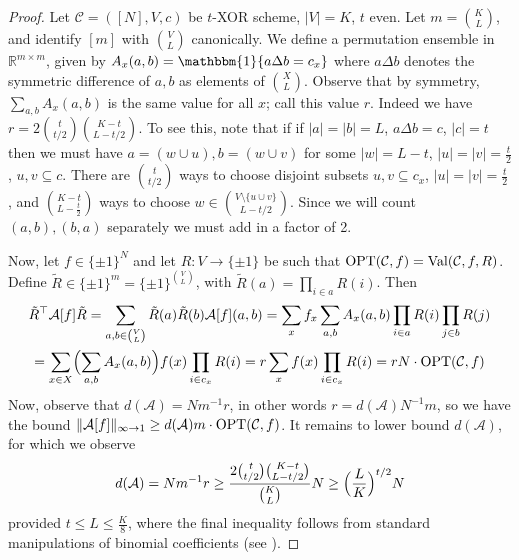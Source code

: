 \begin{proof}
Let $\mathcal{C} = ([N],V,c)$ be $t$-XOR scheme, $|V|=K$, $t$ even.
Let $m = \binom{K}{L}$, and identify $[m]$ with $\binom{V}{L}$ canonically. We define a permutation ensemble in $\mathbb{R}^{m \times m}$, given by $A_x(a,b) = \mathbbm{1}\{a\Delta b = c_x\}$
where $a\Delta b$ denotes the symmetric difference of $a,b$ as elements of $\binom{X}{L}$. Observe that by symmetry, $\sum_{a,b}A_x(a,b)$ is the same value for all $x$; call this value $r$. Indeed we have $r = 2\binom{t}{t/2}\binom{K - t}{L - t/2}$. To see this, note that if if $|a|=|b|=L$, $a \Delta b = c$, $|c|=t$ then we must have $a = (w \cup u), b = (w \cup v)$ for some $|w|=L-t$, $|u|=|v|=\frac{t}{2}$, $u,v \subseteq c$. There are $\binom{t}{t/2}$ ways to choose disjoint subsets $u,v \subseteq c_x$, $|u|=|v|= \frac{t}{2}$, and $\binom{K-t}{L-\frac{t}{2}}$ ways to choose $w \in \binom{V\setminus \{u \cup v\}}{L-t/2}$. Since we will count $(a,b), (b,a)$ separately we must add in a factor of 2. 

Now, let $f \in \{\pm 1\}^N$ and let $R: V \to \{\pm 1\}$ be such that $\mathrm{OPT}(\mathcal{C},f) = \mathrm{Val}(\mathcal{C},f,R)$.
Define $\tilde{R} \in \{\pm 1\}^m = \{\pm 1\}^{\binom{V}{L}}$, with $\tilde{R}(a) = \prod_{i \in a} R(i)$. Then
\begin{gather*}
	\tilde{R}^\top \mathcal{A}[f] \tilde{R} = \sum_{a,b \in \binom{V}{L}} \tilde{R}(a)\tilde{R}(b) \mathcal{A}[f](a,b)
	= \sum_{x} f_x\sum_{a,b}A_x(a,b)\prod_{i \in a} R(i) \prod_{j \in b} R(j)\\
	= \sum_{x \in X}\Bigl(\sum_{a,b}A_x(a,b)\Bigr)f(x)\prod_{i \in c_x} R(i)
	= r\sum_{x} f(x)\prod_{i \in c_x} R(i)
	= rN \cdot \mathrm{OPT}(\mathcal{C},f) 
\end{gather*}
Now, observe that $d(\mathcal{A}) =  Nm^{-1}r$, in other words $r = d(\mathcal{A}) N^{-1}m$, so we have the bound $ \Vert \mathcal{A}[f] \Vert_{\infty \to 1} \geq d(\mathcal{A})m \cdot \mathrm{OPT}(\mathcal{C},f)$. It remains to lower bound $d(\mathcal{A})$, for which we observe
\begin{gather*}
d(\mathcal{A}) = Nm^{-1}r \geq \frac{2\binom{t}{t/2}\binom{K - t}{L - t/2}}{ \binom{K}{L}}N \geq  \Bigl(\frac{L}{K}\Bigr)^{t/2} N
\end{gather*}
provided $t \leq L \leq \frac{K}{8}$, where the final inequality follows from standard manipulations of binomial coefficients (see \cite{simpler-moore}). 
\end{proof}
